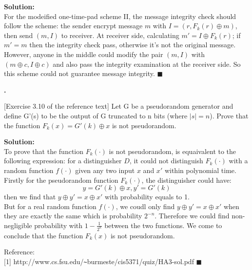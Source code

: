 \documentclass{article}
\newcounter{pcounter}                                   %
\newenvironment{problem}                                %
{                                                       %
    \color{gray}                                        %
    \stepcounter{pcounter}                              %
    \textbf{\arabic{pcounter}.}                         %
}{}                                                     %
\newenvironment{solution}                               %
{\textbf{Solution:} \\}{$\blacksquare$\newline}         %
\begin{document}
    \begin{solution}
        For the modeified one-time-pad scheme II, the message integrity check should follow the scheme: the sender encrypt message $m$ with $I=(r, F_k(r) \oplus m)$, then send $(m, I)$ to receiver. At receiver side, calculating $m'=I \oplus F_k(r)$; if $m'=m$ then the integrity check pass, otherwise it's not the original message.
        \\
        However, anyone in the middle could modify the pair $(m, I)$ with $(m \oplus c, I \oplus c)$ and also pass the integrity examination at the receiver side. So this scheme could not guarantee message integrity.
    \end{solution}

    \begin{problem}
        {[Exercise 3.10 of the reference text]} Let G be a pseudorandom generator and define G'(s) to be the output of G truncated to n bits (where $|s|=n$). Prove that the function $F_k(x)=G'(k) \oplus x$ is not pseudorandom.
    \end{problem}

    \begin{solution}
        To prove that the function $F_k(\cdot)$ is not pseudorandom, is equaivalent to the following expression: for a distinguisher $D$, it could not distinguish $F_k(\cdot)$ with a random function $f(\cdot)$ given any two input $x$ and $x'$ within polynomial time. \\
        Firstly for the pseudorandom function $F_k(\cdot)$, the distinguisher could have:
        $$
            y = G'(k) \oplus x, y' = G'(k)
        $$
        then we find that $y \oplus y' = x \oplus x'$ with probability equals to 1.\\
        But for a real random function $f(\cdot)$, we coudl only find $y \oplus y' = x \oplus x'$ when they are exactly the same which is probability $2^{-n}$. Therefore we could find non-negligible probability with $1 - \frac{1}{2^n}$ between the two functions. We come to conclude that the function $F_k(x)$ is not pseudorandom.

        Reference: \\
        {[1] http://www.cs.fsu.edu/\texttt{\~{}}burmeste/cis5371/quiz/HA3-sol.pdf}
    \end{solution}
\end{document}
